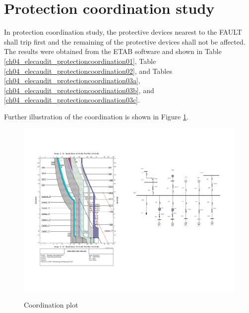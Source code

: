 %
\section{Protection coordination study} \label{ch04_elecaudit_protectioncoordination}
In protection coordination study, the protective devices nearest to the FAULT shall trip first and the remaining of the protective devices shall not be affected. The results were obtained from the ETAB software and shown in Table \ref{ch04_elecaudit_protectioncoordination01}, Table \ref{ch04_elecaudit_protectioncoordination02}, and Tables \ref{ch04_elecaudit_protectioncoordination03a}, \ref{ch04_elecaudit_protectioncoordination03b}, and \ref{ch04_elecaudit_protectioncoordination03c}.









Further illustration of the coordination is shown in Figure \ref{fig_ch04_elecaudit_protection_coordination01}. 

\begin{figure}[]
	\includegraphics[scale=1, angle=90]{figures/fig_ch04_elecaudit_protection_coordination01.pdf} \\
	\caption{Coordination plot}
	\label{fig_ch04_elecaudit_protection_coordination01} 
\end{figure}

